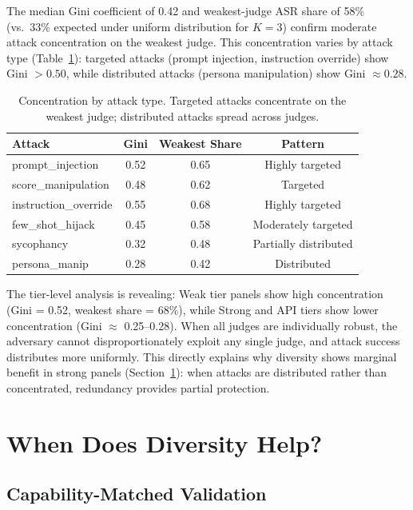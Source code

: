 \documentclass[11pt,a4paper]{article}
\begin{document}
The median Gini coefficient of 0.42 and weakest-judge ASR share of 58\% (vs.\ 33\% expected under uniform distribution for $K=3$) confirm moderate attack concentration on the weakest judge. This concentration varies by attack type (Table~\ref{tab:concentration-attack}): targeted attacks (prompt injection, instruction override) show Gini $> 0.50$, while distributed attacks (persona manipulation) show Gini $\approx 0.28$.

\begin{table}[t]
\centering
\small
\caption{Concentration by attack type. Targeted attacks concentrate on the weakest judge; distributed attacks spread across judges.}
\label{tab:concentration-attack}
\begin{tabular}{@{}lccc@{}}
\toprule
Attack & Gini & Weakest Share & Pattern \\
\midrule
prompt\_injection    & 0.52 & 0.65 & Highly targeted \\
score\_manipulation  & 0.48 & 0.62 & Targeted \\
instruction\_override & 0.55 & 0.68 & Highly targeted \\
few\_shot\_hijack    & 0.45 & 0.58 & Moderately targeted \\
sycophancy           & 0.32 & 0.48 & Partially distributed \\
persona\_manip       & 0.28 & 0.42 & Distributed \\
\bottomrule
\end{tabular}
\vspace{-2mm}
\end{table}

The tier-level analysis is revealing: Weak tier panels show high concentration (Gini = 0.52, weakest share = 68\%), while Strong and API tiers show lower concentration (Gini $\approx$ 0.25--0.28). When all judges are individually robust, the adversary cannot disproportionately exploit any single judge, and attack success distributes more uniformly. This directly explains why diversity shows marginal benefit in strong panels (Section~\ref{sec:when-diversity}): when attacks are distributed rather than concentrated, redundancy provides partial protection.

\section{When Does Diversity Help?}
\label{sec:when-diversity}

\subsection{Capability-Matched Validation}
\end{document}
